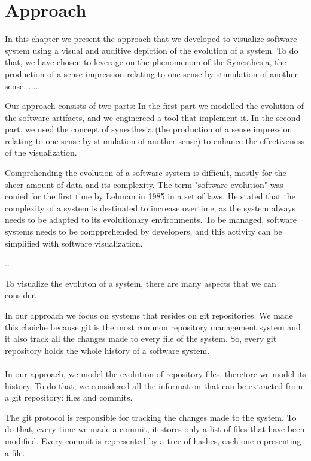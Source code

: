 
\chapter[Approach]{Approach}
\graphicspath{ {images/approach} }

In this chapter we present the approach that we developed to visualize software system using a visual and auditive depiction of the evolution of a system. 
To do that, we have chosen to leverage on the phenomenom of the Synesthesia, the production of a sense impression relating to one sense by stimulation of another sense.
.....





Our approach consists of two parts:
In the first part we modelled the evolution of the software artifacts, and we enginereed a tool that implement it.
In the second part, we used the concept of synesthesia (the production of a sense impression relating to one sense by stimulation of another sense) 
to enhance the effectiveness of the visualization. 

Comprehending the evolution of a software system is difficult, mostly for the sheer amount of data and its complexity. 
The term "software evolution" was conied for the first time by Lehman in 1985 in a set of laws. \cite{Lehman1985}
He stated that the complexity of a system is destinated to increase overtime, as the system always needs to be adapted to its evolutionary environments. 
To be managed, software systems needs to be compprehended by developers, and this activity can be simplified with software visualization. 

..


To visualize the evoluton of a system, there are many aspects that we can consider. \\
\bigbreak

In our approach we focus on systems that resides on git repositories. 
We made this choiche because git is the most common repository management system and it also track all the changes made to every file of the system.
So, every git repository holds the whole history of a software system.\\
\\

In our approach, we model the evolution of repository files, therefore we model its history. 
To do that, we considered all the information that can be extracted from a git repository: files and commits.

The git protocol is responsible for tracking the changes made to the system.
To do that, every time we made a commit, it stores only a list of files that have been modified. 
Every commit is represented by a tree of hashes, each one representing a file. 

